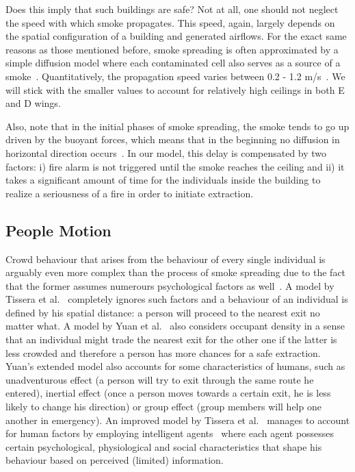 Does this imply that such buildings are safe?
Not at all, one should not neglect the speed with which smoke propagates.
This speed, again, largely depends on the spatial configuration of a building
and generated airflows.
For the exact same reasons as those mentioned before, smoke spreading is often
approximated by a simple diffusion model where each contaminated cell also
serves as a source of a smoke~\cite{Tissera1, Tissera2}.
Quantitatively, the propagation speed varies between 0.2 - 1.2 m/s~\cite{Smoke}.
We will stick with the smaller values to account for relatively high ceilings in
both E and D wings.

Also, note that in the initial phases of smoke spreading, the smoke tends to go
up driven by the buoyant forces, which means that in the beginning no diffusion
in horizontal direction occurs~\cite{Curiac}.
In our model, this delay is compensated by two factors: i) fire alarm is not
triggered until the smoke reaches the ceiling and ii) it takes a significant
amount of time for the individuals inside the building to realize a
seriousness of a fire in order to initiate extraction.

\subsection{People Motion}
Crowd behaviour that arises from the behaviour of every single individual is
arguably even more complex than the process of smoke spreading due to the fact
that the former assumes numerours psychological factors as
well~\cite{Ying, Yuan}.
A model by Tissera et al.~\cite{Tissera1} completely ignores such factors and a
behaviour of an individual is defined by his spatial distance: a person
will proceed to the nearest exit no matter what.
A model by Yuan et al.~\cite{Yuan} also considers occupant density in a sense
that an individual might trade the nearest exit for the other one if the latter
is less crowded and therefore a person has more chances for a safe extraction.
Yuan's extended model also accounts for some characteristics of humans,
such as unadventurous effect (a person will try to exit through the same route
he entered), inertial effect (once a person moves towards a certain exit, he is
less likely to change his direction) or group effect (group members will help
one another in emergency).
An improved model by Tissera et al.~\cite{Tissera2} manages to account for human
factors by employing intelligent agents~\cite{AI} where each agent possesses
certain psychological, physiological and social characteristics that shape his
behaviour based on perceived (limited) information.

